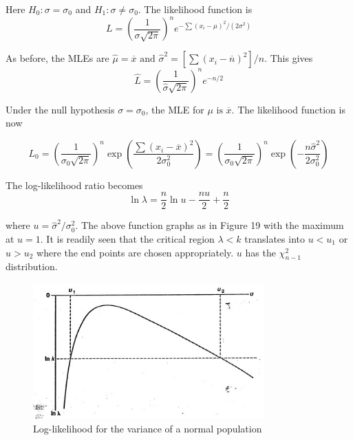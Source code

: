 \documentclass{article}
\begin{document}
Here \(H_0:\sigma=\sigma_0\) and \(H_1:\sigma \neq \sigma_0\). The likelihood function is
\begin{equation*}
    L=\left(\frac{1}{\sigma \sqrt{2\pi}}\right)^n e^{-\sum(x_i-\mu)^2/(2\sigma^2)}
\end{equation*}

As before, the MLEs are \(\hat{\mu}=\overline{x} \text{ and } \hat{\sigma}^2=[\sum(x_i-\overline{n})^2]/n\). This gives
\begin{equation*}
    \hat{L}=\left(\frac{1}{\hat{\sigma}\sqrt{2\pi}} \right)^n e^{-n/2}
\end{equation*}

Under the null hypothesis \(\sigma=\sigma_0\), the MLE for \(\mu \text{ is } \overline{x}\). The likelihood function is now

\begin{equation*}
    L_0=\left(\frac{1}{\sigma_0\sqrt{2\pi}} \right)^n \exp{\left(\frac{\sum(x_i-\overline{x})^2}{2\sigma_0^2} \right)}=\left(\frac{1}{\sigma_0\sqrt{2\pi}} \right)^n \exp{\left(-\frac{n \hat{\sigma}^2}{2 \sigma_0^2}\right)}
\end{equation*}

The log-likelihood ratio becomes
\begin{equation*}
    \ln{\lambda}=\frac{n}{2} \ln{u}-\frac{nu}{2}+\frac{n}{2}
\end{equation*}

where \(u=\hat{\sigma}^2/\sigma_0^2\). The above function graphs as in Figure 19 with the maximum at \(u=1\). It is readily seen that the critical region \(\lambda<k\) translates into \(u<u_1\) or \(u>u_2\) where the end points are chosen appropriately. $u$ has the $\chi_{n-1}^2$ distribution.

\begin{figure} [H]
    \centering
    \includegraphics[width=3.5in]{pics/loglikelihood.jpg}
    \caption{Log-likelihood for the variance of a normal population}
    \label{fig:enter-label1099}
\end{figure}
\end{document}
